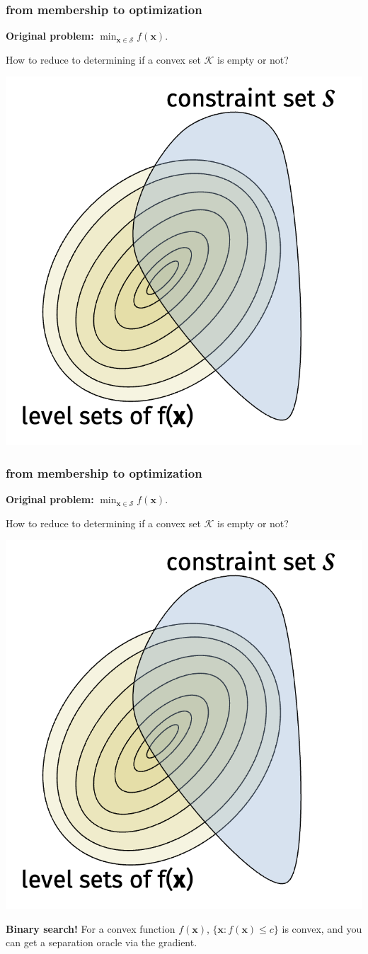 \documentclass[compress]{beamer}
\newcommand{\bv}[1]{\mathbf{#1}}
\begin{document}
\begin{frame}[t]
	\frametitle{from membership to optimization}
	\textbf{Original problem:} $\min_{\bv{x}\in \mathcal{S}} f(\bv{x})$.

	How to reduce to determining if a convex set $\mathcal{K}$ is empty or not?
	\begin{center}
	\includegraphics[width=.5\textwidth]{level_sets_constrained.png}
	\end{center}
	
\end{frame}

\begin{frame}[t]
	\frametitle{from membership to optimization}
	\textbf{Original problem:} $\min_{\bv{x}\in \mathcal{S}} f(\bv{x})$.

	How to reduce to determining if a convex set $\mathcal{K}$ is empty or not?
	\begin{center}
		\vspace{-1em}
	\includegraphics[width=.5\textwidth]{level_sets_constrained.png}
	\vspace{-1em}
	\end{center}
	
	\textbf{Binary search!} For a convex function $f(\bv{x})$, $\{\bv{x}: f(\bv{x}) \leq c\}$ is convex, and you can get a separation oracle via the gradient.
\end{frame}
\end{document}
